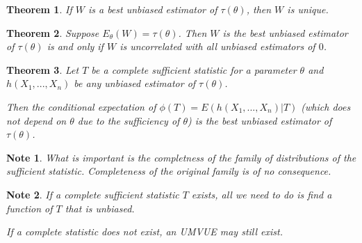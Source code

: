 \documentclass[14pt,twoside]{extreport}
\theoremstyle{dotless}
\newtheorem*{thm}{Theorem} %
\newtheorem*{note}{Note} %
\begin{document}
\begin{thm}
    If $W$ is a best unbiased estimator of $\tau(\theta)$, then $W$ is unique.
\end{thm}

\begin{thm}
    Suppose $E_\theta(W) = \tau(\theta)$. Then $W$ is the best unbiased estimator of $\tau(\theta)$ is and only if $W$ is uncorrelated with all unbiased estimators of $0$.
\end{thm}

\begin{thm}
    Let $T$ be a complete sufficient statistic for a parameter $\theta$ and $h(X_1, ..., X_n)$ be any unbiased estimator of $\tau(\theta)$. 

    Then the conditional expectation of $\phi(T) = E(h(X_1, ..., X_n)|T)$ (which does not depend on $\theta$ due to the sufficiency of $\theta$) is the best unbiased estimator of $\tau(\theta)$.
\end{thm}

\begin{note}
    What is important is the completness of the family of distributions of the sufficient statistic. Completeness of the original family is of no consequence.
\end{note}

\begin{note}
    If a complete sufficient statistic $T$ exists, all we need to do is find a function of $T$ that is unbiased. 

    If a complete statistic does not exist, an UMVUE may still exist.
\end{note}
\end{document}
